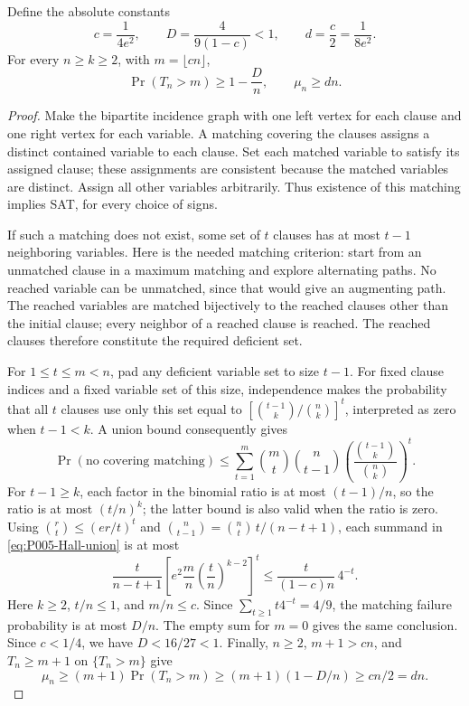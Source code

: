 \begin{proposition}
\label{prop:P005-linear-mean}
Define the absolute constants
\[
 c=\frac1{4e^2},\qquad
 D=\frac4{9(1-c)}<1,\qquad d=\frac c2=\frac1{8e^2}.
\]
For every $n\ge k\ge2$, with $m=\lfloor cn\rfloor$,
\begin{equation}
 \Pr(T_n>m)\ge1-\frac Dn,
 \qquad \mu_n\ge dn.
 \label{eq:P005-mean}
\end{equation}
\end{proposition}
\begin{proof}
Make the bipartite incidence graph with one left vertex for each clause
and one right vertex for each variable. A matching covering the clauses
assigns a distinct contained variable to each clause. Set each matched
variable to satisfy its assigned clause; these assignments are consistent
because the matched variables are distinct. Assign all other variables
arbitrarily. Thus existence of this matching implies SAT, for every
choice of signs.

If such a matching does not exist, some set of $t$ clauses has at most
$t-1$ neighboring variables. Here is the needed matching criterion:
start from an unmatched clause in a maximum matching and explore
alternating paths. No reached variable can be unmatched, since that
would give an augmenting path. The reached variables are matched
bijectively to the reached clauses other than the initial clause;
every neighbor of a reached clause is reached. The reached clauses
therefore constitute the required deficient set.

For $1\le t\le m<n$, pad any deficient variable set to size $t-1$.
For fixed clause indices and a fixed variable set of this size,
independence makes the probability that all $t$ clauses use only this
set equal to
$[\binom{t-1}{k}/\binom nk]^t$, interpreted as zero when $t-1<k$.
A union bound consequently gives
\begin{equation}
 \Pr(\text{no covering matching})
 \le\sum_{t=1}^m\binom mt\binom n{t-1}
             \left(\frac{\binom{t-1}{k}}{\binom nk}\right)^t.
 \label{eq:P005-Hall-union}
\end{equation}
For $t-1\ge k$, each factor in the binomial ratio is at most
$(t-1)/n$, so the ratio is at most $(t/n)^k$; the latter bound is
also valid when the ratio is zero. Using
$\binom rt\le(er/t)^t$ and
$\binom n{t-1}=\binom nt\,t/(n-t+1)$, each summand in
\eqref{eq:P005-Hall-union} is at most
\[
 \frac{t}{n-t+1}
 \left[e^2\frac mn\left(\frac tn\right)^{k-2}\right]^t
 \le \frac{t}{(1-c)n}\,4^{-t}.
\]
Here $k\ge2$, $t/n\le1$, and $m/n\le c$. Since
$\sum_{t\ge1}t4^{-t}=4/9$, the matching failure probability is at most
$D/n$. The empty sum for $m=0$ gives the same conclusion. Since
$c<1/4$, we have $D<16/27<1$. Finally, $n\ge2$,
$m+1>cn$, and $T_n\ge m+1$ on $\{T_n>m\}$ give
\[
 \mu_n\ge(m+1)\Pr(T_n>m)
 \ge(m+1)(1-D/n)\ge cn/2=dn.
\]
\end{proof}

